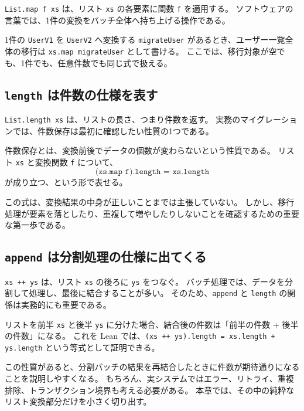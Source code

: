 \texttt{List.map f xs} は、リスト \texttt{xs} の各要素に関数 \texttt{f} を適用する。
ソフトウェアの言葉では、1件の変換をバッチ全体へ持ち上げる操作である。

\begin{softwarebox}
1件の \texttt{UserV1} を \texttt{UserV2} へ変換する \texttt{migrateUser} があるとき、ユーザー一覧全体の移行は \texttt{xs.map migrateUser} として書ける。
ここでは、移行対象が空でも、1件でも、任意件数でも同じ式で扱える。
\end{softwarebox}

\subsection{\texttt{length} は件数の仕様を表す}

\texttt{List.length xs} は、リストの長さ、つまり件数を返す。
実務のマイグレーションでは、件数保存は最初に確認したい性質の1つである。

\begin{definitionbox}
件数保存とは、変換前後でデータの個数が変わらないという性質である。
リスト \texttt{xs} と変換関数 \texttt{f} について、
\[
  \texttt{(xs.map f).length = xs.length}
\]
が成り立つ、という形で表せる。
\end{definitionbox}

この式は、変換結果の中身が正しいことまでは主張していない。
しかし、移行処理が要素を落としたり、重複して増やしたりしないことを確認するための重要な第一歩である。

\subsection{\texttt{append} は分割処理の仕様に出てくる}

\texttt{xs ++ ys} は、リスト \texttt{xs} の後ろに \texttt{ys} をつなぐ。
バッチ処理では、データを分割して処理し、最後に結合することが多い。
そのため、\texttt{append} と \texttt{length} の関係は実務的にも重要である。

\begin{intuitionbox}
リストを前半 \texttt{xs} と後半 \texttt{ys} に分けた場合、結合後の件数は「前半の件数 + 後半の件数」になる。
これを Lean では、\texttt{(xs ++ ys).length = xs.length + ys.length} という等式として証明できる。
\end{intuitionbox}

この性質があると、分割バッチの結果を再結合したときに件数が期待通りになることを説明しやすくなる。
もちろん、実システムではエラー、リトライ、重複排除、トランザクション境界も考える必要がある。
本章では、その中の純粋なリスト変換部分だけを小さく切り出す。

